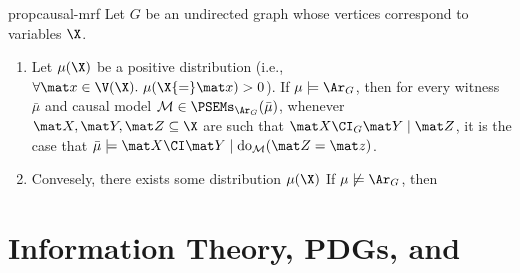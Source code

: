 \begin{subappendices}
{\begin{linked}{prop}{causal-mrf}
    Let $G$ be an undirected graph whose vertices correspond to variables $\X$. 
    \begin{enumerate}
        \item Let $\mu(\X)$ be a positive distribution (i.e., $\forall \mat x \in \V(\X).~\mu(\X{=}\mat x) > 0$).
        If $\mu \models \Ar_G$, then 
        for every witness $\bar\mu$ and causal model $\mathcal M \in \PSEMs_{\Ar_G}(\bar\mu)$,
        whenever $\mat X, \mat Y, \mat Z \subseteq \X$ are such that  $\mat X \CI_G \mat Y \mid \mat Z$, 
        it is the case that
        $\bar\mu \models \mat X \CI \mat Y \mid \mathrm{do}_{\mathcal M}(\mat Z = \mat z)$.
        
        \item
        Convesely, there exists some distribution $\mu(\X)$
        If $\mu \not \models \Ar_G$, then 
        
    \end{enumerate}
\end{linked}
}


\section{Information Theory, PDGs, and \SCibility}

\end{subappendices}
